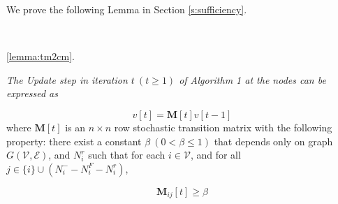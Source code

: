 \documentclass{llncs}
\newcommand{\scripte}{\mathcal{E}}
\newcommand{\scriptv}{\mathcal{V}}
\newcommand{\matrixm}{\textbf{M}}
\begin{document}
We prove the following Lemma in Section \ref{s:sufficiency}.

~

 \ref{lemma:tm2cm}.
{\em 
The {\em Update} step in iteration $t~(t \geq 1)$ of Algorithm 1 at the nodes can be expressed as 

\begin{equation}
v[t] = \matrixm[t] v[t-1]
\end{equation}
where {\normalfont$\matrixm[t]$} is an $n \times n$ row stochastic transition matrix with the following property: there exist a constant $\beta~(0 < \beta \leq 1)$ that depends only on graph $G(\scriptv, \scripte)$, and $N_i^r$ such that for each $i \in \scriptv$, and  for all $j \in \{i\}\cup(N_i^- - N_i^F - N_i^r)$, 

\[
\matrixm_{ij}[t] \geq \beta
\]
}
\end{document}
